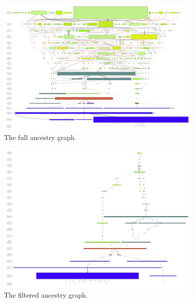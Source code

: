 \begin{figure}[tb!p] %
	\begin{center}
		\includegraphics[width=0.9\textwidth]{../figures/run0_RBM_color_full_30000}
	\end{center}
	\caption{The full ancestry graph.}
	\label{fig:run0full}       %
\end{figure}

\begin{figure}[tb!p] %
	\begin{center}
		\includegraphics[width=0.9\textwidth]{../figures/run0_RBM_color_filtered_30000}
	\end{center}
	\caption{The filtered ancestry graph.}
	\label{fig:run0filtered}       %
\end{figure}

